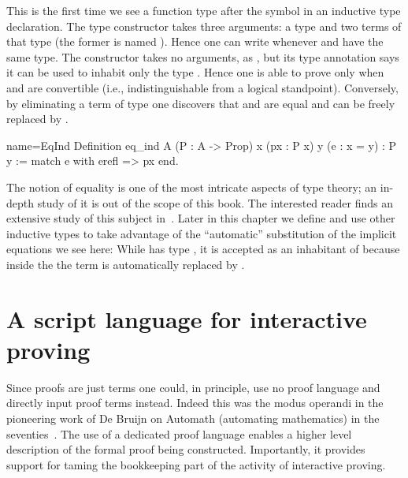 This is the first time we see a function type after the \C{:} symbol
in an inductive type declaration.
The  type constructor takes three arguments: a type  and
two terms of that type (the former is named ).
Hence one can write  whenever  and 
have the same type.
The  constructor takes no arguments, as , but its type
annotation says it can be used to inhabit only the type .
Hence one is able to prove  only when  and  are
convertible
(i.e., indistinguishable from a logical standpoint).
Conversely, by eliminating a term
of type  one discovers that   and  are
equal and  can be freely replaced by .

\begin{coq}{name=EqInd}{}
Definition eq_ind A (P : A -> Prop) x (px : P x) y (e : x = y) : P y :=
  match e with erefl => px end.
\end{coq}

The notion of equality is one of the most intricate aspects of type
theory; an in-depth study of it is out of the scope of this book.  The interested reader
finds an extensive study of this subject in~\cite{hottbook}.  Later in this
chapter we define and use other inductive types to take advantage
of the ``automatic'' substitution of the implicit equations we see here:
While  has type , it is accepted as an
inhabitant of  because inside the  the term 
is automatically replaced by .

\section{A script language for interactive proving}


Since proofs are just terms one could,
in principle, use no proof language and directly input proof terms instead.
Indeed this was the modus operandi in the pioneering work of
De Bruijn on Automath (automating mathematics) in the seventies~\cite{nederpelt-94}.
The use of a dedicated proof language enables a higher level
description of the formal proof being constructed. Importantly, it
provides support for taming the bookkeeping part of the activity of
interactive proving.

